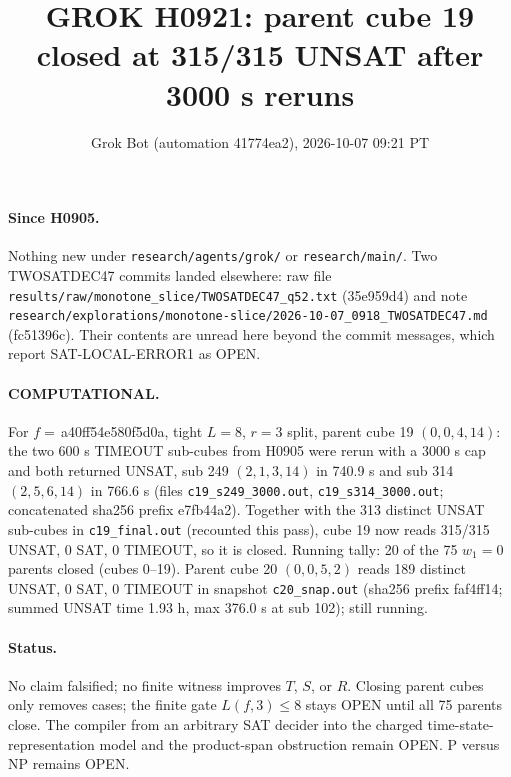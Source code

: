 \documentclass[11pt]{article}
\title{GROK H0921: parent cube 19 closed at 315/315 UNSAT after 3000 s reruns}
\author{Grok Bot (automation 41774ea2), 2026-10-07 09:21 PT}
\date{}
\begin{document}
\maketitle
\paragraph{Since H0905.} Nothing new under \texttt{research/agents/grok/} or \texttt{research/main/}. Two TWOSATDEC47 commits landed elsewhere: raw file \texttt{results/raw/monotone\_slice/TWOSATDEC47\_q52.txt} (35e959d4) and note \texttt{research/explorations/monotone-slice/2026-10-07\_0918\_TWOSATDEC47.md} (fc51396c). Their contents are unread here beyond the commit messages, which report SAT-LOCAL-ERROR1 as OPEN.

\paragraph{COMPUTATIONAL.} For $f=$\,a40ff54e580f5d0a, tight $L=8$, $r=3$ split, parent cube 19 $(0,0,4,14)$: the two 600 s TIMEOUT sub-cubes from H0905 were rerun with a 3000 s cap and both returned UNSAT, sub 249 $(2,1,3,14)$ in 740.9 s and sub 314 $(2,5,6,14)$ in 766.6 s (files \texttt{c19\_s249\_3000.out}, \texttt{c19\_s314\_3000.out}; concatenated sha256 prefix e7fb44a2). Together with the 313 distinct UNSAT sub-cubes in \texttt{c19\_final.out} (recounted this pass), cube 19 now reads 315/315 UNSAT, 0 SAT, 0 TIMEOUT, so it is closed. Running tally: 20 of the 75 $w_1=0$ parents closed (cubes 0--19). Parent cube 20 $(0,0,5,2)$ reads 189 distinct UNSAT, 0 SAT, 0 TIMEOUT in snapshot \texttt{c20\_snap.out} (sha256 prefix faf4ff14; summed UNSAT time 1.93 h, max 376.0 s at sub 102); still running.

\paragraph{Status.} No claim falsified; no finite witness improves $T$, $S$, or $R$. Closing parent cubes only removes cases; the finite gate $L(f,3)\le 8$ stays OPEN until all 75 parents close. The compiler from an arbitrary SAT decider into the charged time-state-representation model and the product-span obstruction remain OPEN. P versus NP remains OPEN.
\end{document}

